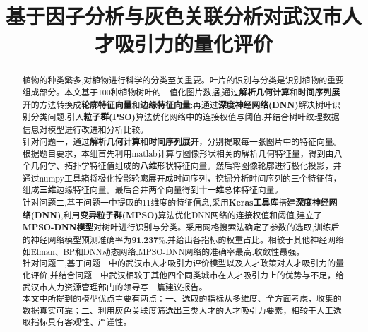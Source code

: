 \documentclass{whutmod}
\title{基于因子分析与灰色关联分析对武汉市人才吸引力的量化评价}
\begin{document}
	
	\begin{abstract}

植物的种类繁多,对植物进行科学的分类至关重要。叶片的识别与分类是识别植物的重要组成部分。本文基于100种植物树叶的二值化图片数据,通过\textbf{解析几何计算}和\textbf{时间序列展开}的方法转换成\textbf{轮廓特征向量}和\textbf{边缘特征向量};再通过\textbf{深度神经网络(DNN)}解决树叶识别分类问题,引入\textbf{粒子群(PSO)}算法优化网络中的连接权值与阈值,并结合树叶纹理数据信息对模型进行改进和分析比较。
~\\



针对问题一，通过\textbf{解析几何计算}和\textbf{时间序列展开}，分别提取每一张图片中的特征向量。根据题目要求，本组首先利用matlab计算与图像形状相关的解析几何特征量，得到由八个几何学、拓扑学特征值组成的\textbf{八维}形状特征向量。然后将图像轮廓进行极化投影，并通过numpy工具箱将极化投影轮廓展开成时间序列，挖掘分析时间序列的三个特征值，组成\textbf{三维}边缘特征向量。最后合并两个向量得到\textbf{十一维}总体特征向量。~\\


针对问题二,基于问题一中提取的11维度的特征信息,采用\textbf{Keras工具库}搭建\textbf{深度神经网络(DNN)},利用\textbf{变异粒子群(MPSO)}算法优化DNN网络的连接权值和阈值,建立了\textbf{MPSO-DNN模型}对树叶进行识别与分类。采用网格搜索法确定了参数的选取,训练后的神经网络模型预测准确率为$\textbf{91.237\%}$,并给出各指标的权重占比。相较于其他神经网络如Elman、BP和DNN动态网络,MPSO-DNN网络的准确率最高,收敛性最强。
~\\

针对问题三,基于问题一中的武汉市人才吸引力评价模型以及人才政策对人才吸引力的量化评价,并结合问题二中武汉相较于其他四个同类城市在人才吸引力上的优势与不足，给武汉市人力资源管理部门的领导写一篇建议报告。
~\\

本文中所提到的模型优点主要有两点：一、选取的指标从多维度、全方面考虑，收集的数据真实可靠；二、利用灰色关联度筛选出三类人才的人才吸引力要素，相较于人工选取指标具有客观性、严谨性。
  
		
	\end{abstract}
	
	\tableofcontents
	\newpage	%
	
\end{document}

